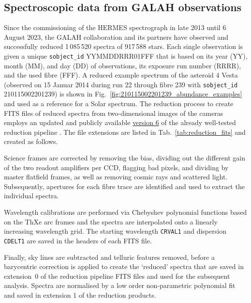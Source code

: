\documentclass[
  journal=pasa,
  manuscript=research-paper, %
  year=2024,
  volume=37
]{cup-journal}
\newcommand{\allstarnumber}{917\,588\xspace}
\newcommand{\allspecnumber}{1\,085\,520\xspace}
\begin{document}
\subsection{Spectroscopic data from GALAH observations}
\label{sec:spectroscopic_data_from_galah_observations}

Since the commissioning of the HERMES spectrograph in late 2013 until 6 August 2023, the GALAH collaboration and its partners have observed and successfully reduced \allspecnumber spectra of \allstarnumber stars. Each single observation is given a unique \texttt{sobject\_id} YYMMDDRRR01FFF that is based on its year (YY), month (MM), and day (DD) of observations, its exposure run number (RRRR), and the used fibre (FFF). A reduced example spectrum of the asteroid 4 Vesta (observed on 15 Januar 2014 during run 22 through fibre 239 with \texttt{sobject\_id} 210115002201239) is shown in Fig.~\ref{fig:210115002201239_abundance_examples} and used as a reference for a Solar spectrum. The reduction process to create FITS files of reduced spectra from two-dimensional images of the cameras employs an updated and publicly available \href{https://github.com/sheliak/galah_reduction/blob/master/extract6.0.py}{version 6} of the already well-tested reduction pipeline \citep{Kos2017}. The file extensions are listed in Tab.~\ref{tab:reduction_fits} and created as follows.

Science frames are corrected by removing the bias, dividing out the different gain of the two readout amplifiers per CCD, flagging bad pixels, and dividing by master flatfield frames, as well as removing cosmic rays and scattered light. Subsequently, apertures for each fibre trace are identified and used to extract the individual spectra. 

Wavelength calibrations are performed via Chebyshev polynomial functions based on the ThXe arc frames and the spectra are interpolated onto a linearly increasing wavelength grid. The starting wavelength \texttt{CRVAL1} and dispersion \texttt{CDELT1} are saved in the headers of each FITS file.

Finally, sky lines are subtracted and telluric features removed, before a barycentric correction is applied to create the `reduced' spectra that are saved in extension~0 of the reduction pipeline FITS files and used for the subsequent analysis. Spectra are normalised by a low order non-parametric polynomial fit and saved in extension 1 of the reduction products.
\end{document}
